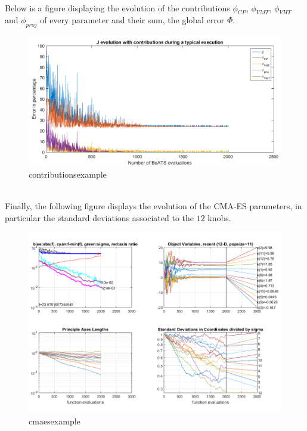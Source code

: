\\
Below is a figure displaying the evolution of the contributions $\phi_{CP}$, $\phi_{VMT}$, $\phi_{VHT}$ and $\phi_{proj}$ of every parameter and their sum, the global error $\Phi$.\\
\begin{figure}[h]
	\label{fig:contributionsexample}
	\caption{contributionsexample}
	\includegraphics[width=7in]{figures/results_figures/contributionsexample.png}
\end{figure}	
\\
Finally, the following figure displays the evolution of the CMA-ES parameters, in particular the standard deviations associated to the $12$ knobs.\\
\begin{figure}[h]
	\label{fig:cmaesexample}
	\caption{cmaesexample}
	\includegraphics[width=7in]{figures/results_figures/cmaesexample.png}
\end{figure}	

